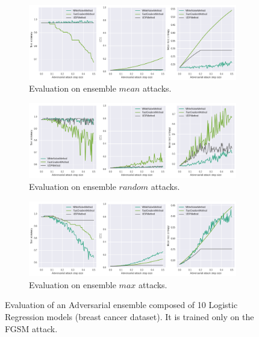 
\begin{figure}[!htbp]
    \begin{subfigure}{\textwidth}
      \centering
      \includegraphics[width=\linewidth]{figures/eval/eval_adv_uq_train_ensemble_fgsm_mean.png}
     \caption{Evaluation on ensemble $mean$ attacks.}
    \end{subfigure}
     \begin{subfigure}{\textwidth}
      \centering
      \includegraphics[width=\linewidth]{figures/eval/eval_adv_uq_train_ensemble_fgsm_random.png}
      \caption{Evaluation on ensemble $random$ attacks.}
    \end{subfigure}
    \begin{subfigure}{\textwidth}
      \centering
      \includegraphics[width=\linewidth]{figures/eval/eval_adv_uq_train_ensemble_fgsm_max.png}
       \caption{Evaluation on ensemble $max$ attacks.}
    \end{subfigure}
    \caption{Evaluation of an Adversarial ensemble composed of 10 Logistic Regression models (breast cancer dataset). It is trained only on the FGSM attack.}
    \label{fig:adversarial-evaluation-training-ensemble-fgsm}
\end{figure}

